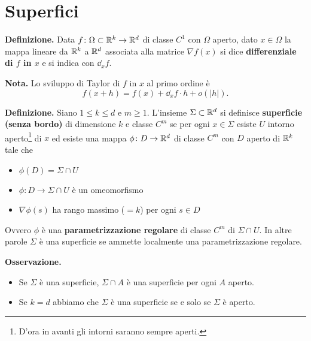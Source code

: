 \section{Superfici}

\textbf{Definizione.} Data $f \colon \Omega \subset \mathbb R^k \to \mathbb R^d$ di classe $C^1$ con $\Omega$ aperto, dato $x \in \Omega$ la mappa lineare da $\mathbb R^k$ a $\mathbb R^d$ associata alla matrice $\nabla f(x)$ si dice \textbf{differenziale di $f$ in $x$} e si indica con $\dd_x f$.

\textbf{Nota.} Lo sviluppo di Taylor di $f$ in $x$ al primo ordine è
$$
	f(x+h) = f(x) + \dd_x f \cdot h + o(|h|).
$$

\textbf{Definizione.} Siano $1 \leq k \leq d$ e $m \geq 1$. L'insieme $\Sigma \subset \mathbb R^d$ si definisce \textbf{superficie (senza bordo)} di dimensione $k$ e classe $C^m$ se per ogni $x \in \Sigma$ esiste $U$ intorno aperto\footnote{D'ora in avanti gli intorni saranno sempre aperti.} di $x$ ed esiste una mappa $\phi \colon D \to \mathbb R^d$  di classe $C^m$ con $D$ aperto di $\mathbb R^k$ tale che
\begin{itemize}

	\item $\phi(D) = \Sigma \cap U$

	\item $\phi \colon D \to \Sigma \cap U$ è un omeomorfismo

	\item $\nabla \phi(s)$ ha rango massimo ($=k$) per ogni $s \in D$

\end{itemize}
Ovvero $\phi$ è una \textbf{parametrizzazione regolare} di classe $C^m$ di $\Sigma \cap U$.
In altre parole $\Sigma$ è una superficie se ammette localmente una parametrizzazione regolare.

\textbf{Osservazione.} 
\begin{itemize}

	\item Se $\Sigma$ è una superficie, $\Sigma \cap A$ è una superficie per ogni $A$ aperto.

	\item Se $k = d$ abbiamo che $\Sigma$ è una superficie se e solo se $\Sigma$ è aperto.

\end{itemize}


